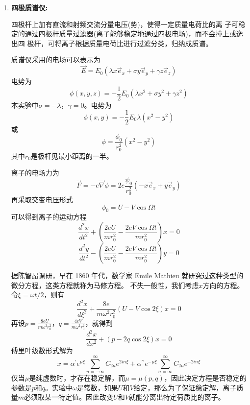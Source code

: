 \documentclass[11pt,a4paper]{ctexart}
\newcommand{\beq}{\begin{equation}}
\newcommand{\eeq}{\end{equation}}
\begin{document}
\begin{enumerate}
\item \textbf{四极质谱仪:}\par
四极杆上加有直流和射频交流分量电压(势)，使得一定质量电荷比的离 子可稳定的通过四极杆质量过滤器(离子能够稳定地通过四极电场)，而不会撞上或逸出四 极杆，可将离子根据质量电荷比进行过滤分类，归纳成质谱。\par
质谱仪采用的电场可以表示为
\beq
\vec{E} = E_0 (\lambda x \vec{e}_x + \sigma y \vec{e}_y + \gamma z \vec{e}_z )
\eeq
电势为
\beq
\phi(x,y,z) = -\frac{1}{2} E_0 ( \lambda x^2 + \sigma y^2 + \gamma z^2 )
\eeq
本实验中$\sigma = -\lambda$，$\gamma = 0$。电势为
\beq
\phi(x,y) = -\frac{1}{2} E_0 \lambda (x^2 - y^2)
\eeq
或
\beq
\phi = \frac{\phi_0}{r_0^2} (x^2 - y^2)
\eeq
其中$r_0$是极杆见最小距离的一半。\par
离子的电场力为
\beq
\vec{F} = -e \vec{\nabla} \phi = 2e \frac{\psi_0}{r_0^2}  (-x\vec{e}_x + y \vec{e}_y )
\eeq
再采取交变电压形式
\beq
\phi_0 = U - V \cos \varOmega t
\eeq
可以得到离子的运动方程
\beq
\frac{d^{2} x}{d t^{2}}+\left(\frac{2 e U}{m r_{0}^{2}}-\frac{2 e V \cos \Omega t}{m r_{0}^{2}}\right) x=0
\eeq
\beq
\frac{d^{2} y}{d t^{2}}-\left(\frac{2 e U}{m r_{0}^{2}}-\frac{2 e V \cos \Omega t}{m r_{0}^{2}}\right) y=0
\eeq
\par
据陈智昂调研，早在 1860 年代，数学家 Emile Mathieu 就研究过这种类型的微分方程，这类方程就称为马修方程。 不失一般性，我们考虑$x$方向的方程。令$\xi = \omega t / 2$，则有
\beq
\frac{d^{2} x}{d \xi^{2}}+\frac{8 e}{m \omega^{2} r_{0}^{2}}(U - V \cos 2 \xi) x=0
\eeq
再设$p = \frac{8eU}{m\omega^2 r_0^2}$，$q = \frac{4eV}{m\omega^2 r_0^2}$，就得到
\beq
\frac{d^{2} x}{d x^{2}}+(p-2 q \cos 2 \xi) x=0
\eeq
傅里叶级数形式解为
\beq
x=\alpha^{\prime} e^{\mu \xi} \sum_{n=-\infty}^{\infty} C_{2 n} e^{2 i n \xi}+\alpha^{\prime \prime} e^{-\mu \xi} \sum_{n=\infty}^{\infty} C_{2 n} e^{-2 i n \xi}
\eeq
仅当$\mu$是纯虚数时，才存在稳定解，而$\mu = \mu (p,q)$，因此决定方程是否稳定的参数是$p$和$q$。实验中$\omega$是常数，如果$U$和$V$给定，那么为了保证稳定解，离子质量$m$必须取某一特定值。因此改变$U$和$V$就能分离出特定荷质比的离子。

\end{enumerate}
\end{document}
